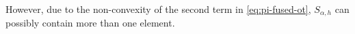 \documentclass{article}
\begin{document}
However, due to the non-convexity of the second term in \eqref{eq:pi-fused-ot}, $S_{\alpha,h}$ can possibly contain more than one element.












\end{document}
